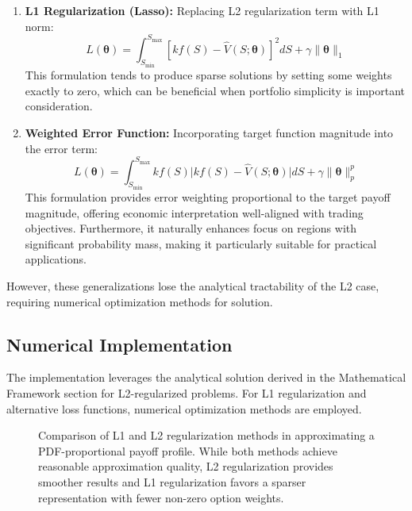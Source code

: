 \documentclass[12pt]{article}
\begin{document}
\begin{enumerate}
    \item \textbf{L1 Regularization (Lasso):} Replacing L2 regularization term with L1 norm:
    \begin{equation}
        L(\boldsymbol{\theta}) = 
            \int_{S_{\min}}^{S_{\max}} 
                \left[ k f(S) - \hat{V}(S;\boldsymbol{\theta}) \right]^2 dS + 
            \gamma \|\boldsymbol{\theta}\|_1
    \end{equation}
    This formulation tends to produce sparse solutions by setting some weights exactly 
    to zero, which can be beneficial when portfolio simplicity is important consideration.

    \item \textbf{Weighted Error Function:} Incorporating target function magnitude 
    into the error term:
    \begin{equation}
        L(\boldsymbol{\theta}) = 
            \int_{S_{\min}}^{S_{\max}} 
                k f(S) \Big| k f(S) - \hat{V}(S;\boldsymbol{\theta}) \Big| dS + 
            \gamma \|\boldsymbol{\theta}\|_p^p
    \end{equation}
    This formulation provides error weighting proportional to the target payoff magnitude, 
    offering economic interpretation well-aligned with trading objectives. Furthermore, it 
    naturally enhances focus on regions with significant probability mass, making it particularly 
    suitable for practical applications.
\end{enumerate}

However, these generalizations lose the analytical tractability of the L2 case, 
requiring numerical optimization methods for solution.

\subsection{Numerical Implementation}
The implementation leverages the analytical solution derived in the Mathematical Framework 
section for L2-regularized problems. For L1 regularization and alternative loss functions, 
numerical optimization methods are employed.

\begin{figure}[htbp]
\centering

\caption{Comparison of L1 and L2 regularization methods in approximating a PDF-proportional 
payoff profile. While both methods achieve reasonable approximation quality, L2 regularization 
provides smoother results and L1 regularization favors a sparser representation with fewer 
non-zero option weights.}
\label{fig:regularization}
\end{figure}
\end{document}
